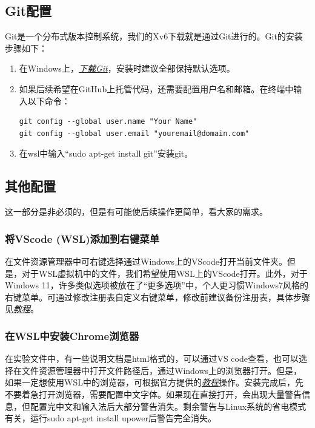 \documentclass[fontset=ubuntu]{ctexart}
\let\oldhref\href{}
\renewcommand{\href}[2]{\oldhref{#1}{\textit{#2}}}
\begin{document}
\newpage{}

\subsection{Git配置}

Git是一个分布式版本控制系统，我们的Xv6下载就是通过Git进行的。Git的安装步骤如下：

\begin{enumerate}
    \item 在Windows上，\href{https://git-scm.com/downloads}{下载Git}，安装时建议全部保持默认选项。
    \item 如果后续希望在GitHub上托管代码，还需要配置用户名和邮箱。在终端中输入以下命令：
          \begin{lstlisting}
git config --global user.name "Your Name"
git config --global user.email "youremail@domain.com"
        \end{lstlisting}
    \item 在wsl中输入“sudo apt-get install git”安装git。
\end{enumerate}

\subsection{其他配置}

这一部分是非必须的，但是有可能使后续操作更简单，看大家的需求。

\subsubsection{将VScode (WSL)添加到右键菜单}

在文件资源管理器中可右键选择通过Windows上的VScode打开当前文件夹。但是，对于WSL虚拟机中的文件，我们希望使用WSL上的VScode打开。此外，对于Windows 11，许多类似选项被放在了“更多选项”中，个人更习惯Windows7风格的右键菜单。可通过修改注册表自定义右键菜单，修改前建议备份注册表，具体步骤见\href{https://zhuanlan.zhihu.com/p/695724154}{教程}。

\subsubsection{在WSL中安装Chrome浏览器}

在实验文件中，有一些说明文档是html格式的，可以通过VS code查看，也可以选择在文件资源管理器中打开文件路径后，通过Windows上的浏览器打开。但是，如果一定想使用WSL中的浏览器，可根据官方提供的\href{https://learn.microsoft.com/zh-cn/windows/wsl/tutorials/gui-apps\#install-google-chrome-for-linux}{教程}操作。安装完成后，先不要着急打开浏览器，需要配置中文字体。如果现在直接打开，会出现大量警告信息，但配置完中文和输入法后大部分警告消失。剩余警告与Linux系统的省电模式有关，运行sudo apt-get install upower后警告完全消失\cite{wslissue2023}。
\end{document}
